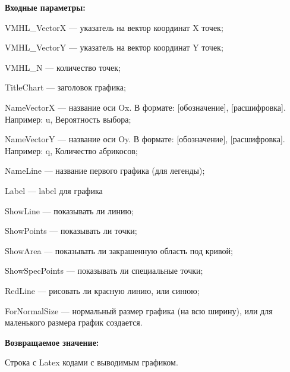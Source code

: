 \textbf{Входные параметры:}

VMHL\_VectorX --- указатель на вектор координат X точек;
 
VMHL\_VectorY --- указатель на вектор координат Y точек;
 
VMHL\_N --- количество точек;
 
TitleChart --- заголовок графика;
 
NameVectorX --- название оси Ox. В формате: [обозначение], [расшифровка]. Например: u, Вероятность выбора;
 
NameVectorY --- название оси Oy. В формате: [обозначение], [расшифровка]. Например: q, Количество абрикосов;
 
NameLine --- название первого графика (для легенды);
 
Label --- label для графика
 
ShowLine --- показывать ли линию;
 
ShowPoints --- показывать ли точки;
 
ShowArea --- показывать ли закрашенную область под кривой;
 
ShowSpecPoints --- показывать ли специальные точки;
 
RedLine --- рисовать ли красную линию, или синюю;
 
ForNormalSize --- нормальный размер графика (на всю ширину), или для маленького размера график создается.
	
\textbf{Возвращаемое значение:}

Строка с Latex кодами с выводимым графиком.